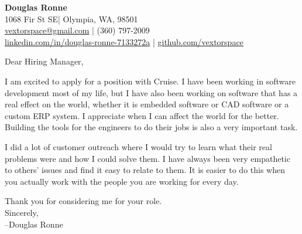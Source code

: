 \documentclass[letter,12pt]{article}
\begin{document}
\begin{center}
    {\Huge \textbf{Douglas Ronne}}\\
    \vspace{2mm}
    1068 Fir St SE| Olympia, WA, 98501\\
    \href{mailto:vextorspace@gmail.com}{vextorspace@gmail.com} | (360) 797-2009\\
    \href{www.linkedin.com/in/douglas-ronne-7133272a}{linkedin.com/in/douglas-ronne-7133272a} | \href{https://github.com/vextorspace}{github.com/vextorspace}
\end{center}

Dear Hiring Manager,

I am excited to apply for a position with Cruise. I have been working in software development most of my life, but I have also been working on software that has a real effect on the world, whether it is embedded software or CAD software or a custom ERP system. I appreciate when I can affect the world for the better. Building the tools for the engineers to do their jobs is also a very important task. 

I did a lot of customer outreach where I would try to learn what their real problems were and how I could solve them. I have always been very empathetic to others' issues and find it easy to relate to them. It is easier to do this when you actually work with the people you are working for every day.

Thank you for considering me for your role.
\\
Sincerely,\\
--Douglas Ronne
\end{document}
